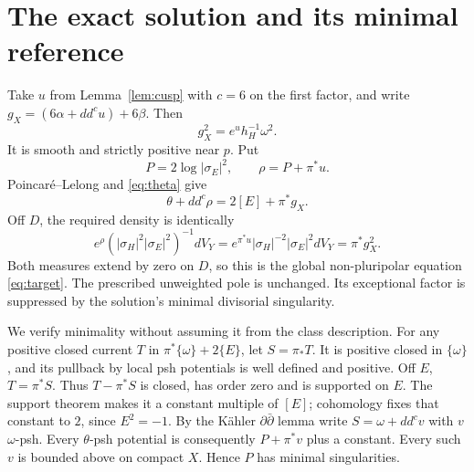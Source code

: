 \documentclass[11pt]{article}
\newcommand{\ddc}{dd^c}
\begin{document}
\section{The exact solution and its minimal reference}
Take $u$ from Lemma~\ref{lem:cusp} with $c=6$ on the first factor,
and write $g_X=(6\alpha+\ddc u)+6\beta$. Then
\[
 g_X^2=e^uh_H^{-1}\omega^2.
\]
It is smooth and strictly positive near $p$. Put
\begin{equation}\label{eq:rho}
 P=2\log|\sigma_E|^2,\qquad\rho=P+\pi^*u.
\end{equation}
Poincar\'e--Lelong and \eqref{eq:theta} give
\begin{equation}\label{eq:current}
 \theta+\ddc\rho=2[E]+\pi^*g_X.
\end{equation}
Off $D$, the required density is identically
\[
 e^\rho(|\sigma_H|^2|\sigma_E|^2)^{-1}dV_Y
       =e^{\pi^*u}|\sigma_H|^{-2}|\sigma_E|^2dV_Y
       =\pi^*g_X^2.
\]
Both measures extend by zero on $D$, so this is the global
non-pluripolar equation \eqref{eq:target}.
The prescribed unweighted pole is unchanged. Its exceptional factor
is suppressed by the solution's minimal divisorial singularity.

We verify minimality without assuming it from the class description.
For any positive closed current $T$ in $\pi^*\{\omega\}+2\{E\}$,
let $S=\pi_*T$. It is positive closed in $\{\omega\}$, and its
pullback by local psh potentials is well defined and positive.
Off $E$, $T=\pi^*S$. Thus $T-\pi^*S$ is closed, has order zero and
is supported on $E$. The support theorem
\cite[Chapter III, Corollary 2.14]{Dem} makes it a constant multiple
of $[E]$; cohomology fixes that constant to $2$, since $E^2=-1$.
By the K\"ahler $\partial\bar\partial$ lemma write
$S=\omega+\ddc v$ with $v$ $\omega$-psh. Every $\theta$-psh
potential is consequently $P+\pi^*v$ plus a constant.
Every such $v$ is bounded above on compact $X$. Hence $P$ has
minimal singularities.
\end{document}
